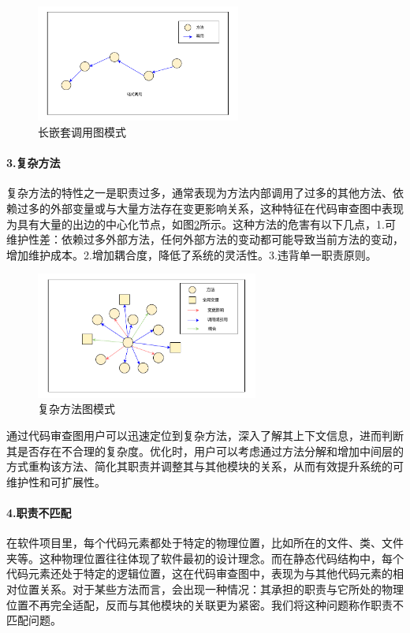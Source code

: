 \begin{figure}[h]
\centering
\includegraphics[width = 0.6\textwidth]{figures/链式调用模式图_2.pdf}
\caption{长嵌套调用图模式}
\label{1_长嵌套调用图模式}
\end{figure}




\paragraph{3.复杂方法} 复杂方法的特性之一是职责过多，通常表现为方法内部调用了过多的其他方法、依赖过多的外部变量或与大量方法存在变更影响关系，这种特征在代码审查图中表现为具有大量的出边的中心化节点，如图\ref{1_复杂方法图模式}所示。这种方法的危害有以下几点，1.可维护性差：依赖过多外部方法，任何外部方法的变动都可能导致当前方法的变动，增加维护成本。2.增加耦合度，降低了系统的灵活性。3.违背单一职责原则。

\begin{figure}[h]
\centering
\includegraphics[width = 0.65\textwidth]{figures/3_复杂方法图模式.pdf}
\caption{复杂方法图模式}
\label{1_复杂方法图模式}
\end{figure}



通过代码审查图用户可以迅速定位到复杂方法，深入了解其上下文信息，进而判断其是否存在不合理的复杂度。优化时，用户可以考虑通过方法分解和增加中间层的方式重构该方法、简化其职责并调整其与其他模块的关系，从而有效提升系统的可维护性和可扩展性。


\paragraph{4.职责不匹配} 在软件项目里，每个代码元素都处于特定的物理位置，比如所在的文件、类、文件夹等。这种物理位置往往体现了软件最初的设计理念。而在静态代码结构中，每个代码元素还处于特定的逻辑位置，这在代码审查图中，表现为与其他代码元素的相对位置关系。对于某些方法而言，会出现一种情况：其承担的职责与它所处的物理位置不再完全适配，反而与其他模块的关联更为紧密。我们将这种问题称作职责不匹配问题。

